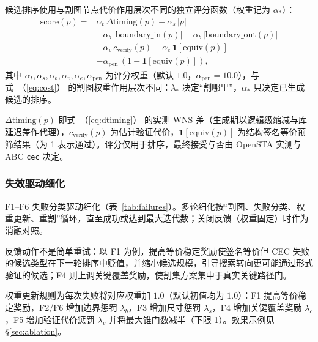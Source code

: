 \documentclass[journal]{IEEEtran}
\renewcommand{\eqref}[1]{\textup{（\ref{#1}）}}
\begin{document}
候选排序使用与割图节点代价作用层次不同的独立评分函数（权重记为 $\alpha_*$）：
{\small
\begin{equation}\label{eq:score}
\begin{split}
\mathrm{score}(p) = {}&\alpha_t\,\Delta\mathrm{timing}(p) - \alpha_s\,|p| \\
&- \alpha_b\,|\mathrm{boundary\_in}(p)| - \alpha_b\,|\mathrm{boundary\_out}(p)| \\
&- \alpha_v\,c_{\mathrm{verify}}(p) + \alpha_e\,\mathbf{1}[\mathrm{equiv}(p)] \\
&- \alpha_{\mathrm{pen}}\,(1-\mathbf{1}[\mathrm{equiv}(p)]),
\end{split}
\end{equation}
}
其中 $\alpha_t,\alpha_s,\alpha_b,\alpha_v,\alpha_e,\alpha_{\mathrm{pen}}$ 为评分权重（默认 $1.0$，$\alpha_{\mathrm{pen}}=10.0$），与式~\eqref{eq:cost} 的割图权重作用层次不同：$\lambda_*$ 决定“割哪里”，$\alpha_*$ 只决定已生成候选的排序。

$\Delta\mathrm{timing}(p)$ 即式~\eqref{eq:dtiming} 的实测 WNS 差（生成期以逻辑级缩减与库延迟差作代理），$c_{\mathrm{verify}}(p)$ 为估计验证代价，$\mathbf{1}[\mathrm{equiv}(p)]$ 为结构签名等价预筛结果（为 1 表示通过）。评分仅用于排序，最终接受与否由 OpenSTA 实测与 ABC \texttt{cec} 决定。

\subsubsection{失效驱动细化}
F1--F6 失败分类驱动细化（表~\ref{tab:failures}）。多轮细化按“割图、失败分类、权重更新、重割”循环，直至成功或达到最大迭代数；关闭反馈（权重固定）时作为消融对照。

反馈动作不是简单重试：以 F1 为例，提高等价稳定奖励使签名等价但 CEC 失败的候选类型在下一轮排序中贬值，并缩小候选规模，引导搜索转向更可能通过形式验证的候选；F4 则上调关键覆盖奖励，使割集方案集中于真实关键路径门。

权重更新规则为每次失败将对应权重加 $1.0$（默认初值均为 $1.0$）：F1 提高等价稳定奖励，F2/F6 增加边界惩罚 $\lambda_b$，F3 增加尺寸惩罚 $\lambda_s$，F4 增加关键覆盖奖励 $\lambda_c$，F5 增加验证代价惩罚 $\lambda_v$ 并将最大锥门数减半（下限 1）。效果示例见 \S\ref{sec:ablation}。
\end{document}
